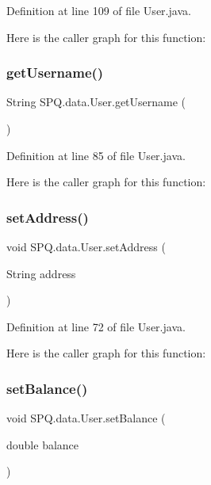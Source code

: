 Definition at line 109 of file User.\+java.

Here is the caller graph for this function\+:
\mbox{\label{class_s_p_q_1_1data_1_1_user_a55d2e322edbbe446287ce25baecdd421}} 
\subsubsection{\texorpdfstring{get\+Username()}{getUsername()}}
{\footnotesize\ttfamily String S\+P\+Q.\+data.\+User.\+get\+Username (\begin{DoxyParamCaption}{ }\end{DoxyParamCaption})}



Definition at line 85 of file User.\+java.

Here is the caller graph for this function\+:
\mbox{\label{class_s_p_q_1_1data_1_1_user_ab6e40ae379cda1d98a5873365df30736}} 
\subsubsection{\texorpdfstring{set\+Address()}{setAddress()}}
{\footnotesize\ttfamily void S\+P\+Q.\+data.\+User.\+set\+Address (\begin{DoxyParamCaption}\item[{String}]{address }\end{DoxyParamCaption})}



Definition at line 72 of file User.\+java.

Here is the caller graph for this function\+:
\mbox{\label{class_s_p_q_1_1data_1_1_user_ab9b205d96fa6c53cc3956c2ddcc9c4a7}} 
\subsubsection{\texorpdfstring{set\+Balance()}{setBalance()}}
{\footnotesize\ttfamily void S\+P\+Q.\+data.\+User.\+set\+Balance (\begin{DoxyParamCaption}\item[{double}]{balance }\end{DoxyParamCaption})}



